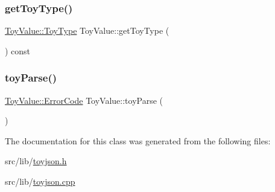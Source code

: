 \subsubsection{\texorpdfstring{get\+Toy\+Type()}{getToyType()}}
{\footnotesize\ttfamily \hyperlink{classToyValue_afe40e1c745e0cc296066ae27f9d7f9fb}{Toy\+Value\+::\+Toy\+Type} Toy\+Value\+::get\+Toy\+Type (\begin{DoxyParamCaption}{ }\end{DoxyParamCaption}) const}

\mbox{\label{classToyValue_acd39c13bcfa9dacd70e6823f9dfedf41}} 
\subsubsection{\texorpdfstring{toy\+Parse()}{toyParse()}}
{\footnotesize\ttfamily \hyperlink{classToyValue_a31b548920488141921c06e2825c6e2f1}{Toy\+Value\+::\+Error\+Code} Toy\+Value\+::toy\+Parse (\begin{DoxyParamCaption}{ }\end{DoxyParamCaption})}



The documentation for this class was generated from the following files\+:\begin{DoxyCompactItemize}
\item 
src/lib/\hyperlink{toyjson_8h}{toyjson.\+h}\item 
src/lib/\hyperlink{toyjson_8cpp}{toyjson.\+cpp}\end{DoxyCompactItemize}
